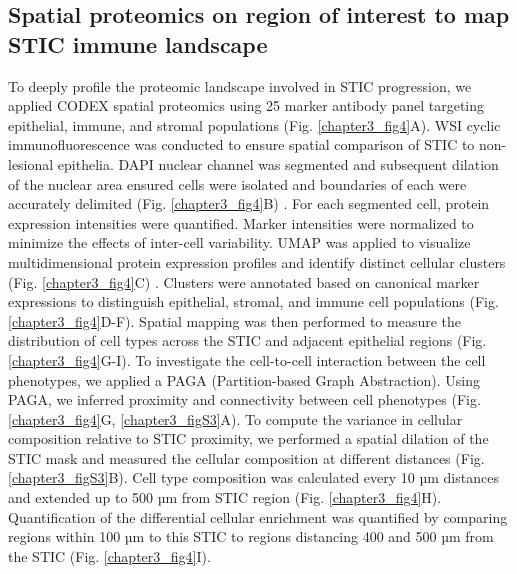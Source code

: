 \begin{refsection}
    \subsection{Spatial proteomics on region of interest to map STIC immune landscape}
    To deeply profile the proteomic landscape involved in STIC progression, we applied CODEX spatial proteomics using 25 marker antibody panel targeting epithelial, immune, and stromal populations (Fig. \ref{chapter3_fig4}A). WSI cyclic immunofluorescence was conducted to ensure spatial comparison of STIC to non-lesional epithelia. DAPI nuclear channel was segmented and subsequent dilation of the nuclear area ensured cells were isolated and boundaries of each were accurately delimited (Fig. \ref{chapter3_fig4}B) \cite{Schmidt2018Cell}. For each segmented cell, protein expression intensities were quantified. Marker intensities were normalized to minimize the effects of inter-cell variability. UMAP was applied to visualize multidimensional protein expression profiles and identify distinct cellular clusters (Fig. \ref{chapter3_fig4}C) \cite{Squidpy,Wolf2018SCANPY,Virshup2021anndata,Krzywinski2009Circos,Hunter2007Matplotlib,Waskom2021seaborn,McInnes2020UMAP,Shimoyama2022pyCirclize,pandas2024pandas,Harris2020Array,Pedregosa2011Scikit}. Clusters were annotated based on canonical marker expressions to distinguish epithelial, stromal, and immune cell populations (Fig. \ref{chapter3_fig4}D-F). 
    Spatial mapping was then performed to measure the distribution of cell types across the STIC and adjacent epithelial regions (Fig. \ref{chapter3_fig4}G-I). To investigate the cell-to-cell interaction between the cell phenotypes, we applied a PAGA (Partition-based Graph Abstraction)\cite{Wolf2019PAGA}. Using PAGA, we inferred proximity and connectivity between cell phenotypes (Fig. \ref{chapter3_fig4}G, \ref{chapter3_figS3}A). 
    To compute the variance in cellular composition relative to STIC proximity, we performed a spatial dilation of the STIC mask and measured the cellular composition at different distances (Fig. \ref{chapter3_figS3}B). Cell type composition was calculated every 10 µm distances and extended up to 500 µm from STIC region (Fig. \ref{chapter3_fig4}H). Quantification of the differential cellular enrichment was quantified by comparing regions within 100 µm to this STIC to regions distancing 400 and 500 µm from the STIC (Fig. \ref{chapter3_fig4}I).
    

\end{refsection}
